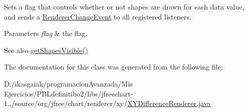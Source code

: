 Sets a flag that controls whether or not shapes are drawn for each data value, and sends a \mbox{\hyperlink{}{Renderer\+Change\+Event}} to all registered listeners.


\begin{DoxyParams}{Parameters}
{\em flag} & the flag.\\
\hline
\end{DoxyParams}
\begin{DoxySeeAlso}{See also}
\mbox{\hyperlink{classorg_1_1jfree_1_1chart_1_1renderer_1_1xy_1_1_x_y_difference_renderer_a29eb3619b03bae151989da762c41d2c9}{get\+Shapes\+Visible()}} 
\end{DoxySeeAlso}


The documentation for this class was generated from the following file\+:\begin{DoxyCompactItemize}
\item 
D\+:/ikasgaiak/programacion\+Avanzada/\+Mis Ejercicios/\+P\+B\+Ldefinitibo2/libs/jfreechart-\/1../source/org/jfree/chart/renderer/xy/\mbox{\hyperlink{_x_y_difference_renderer_8java}{X\+Y\+Difference\+Renderer.\+java}}\end{DoxyCompactItemize}
